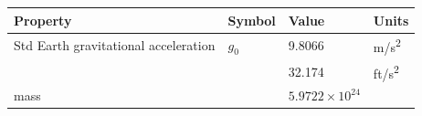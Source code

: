 \documentclass[
]{book}
\begin{document}
\begin{longtable}[]{@{}llll@{}}
\toprule
\begin{minipage}[b]{0.34\columnwidth}\raggedright
Property\strut
\end{minipage} & \begin{minipage}[b]{0.06\columnwidth}\raggedright
Symbol\strut
\end{minipage} & \begin{minipage}[b]{0.44\columnwidth}\raggedright
Value\strut
\end{minipage} & \begin{minipage}[b]{0.05\columnwidth}\raggedright
Units\strut
\end{minipage}\tabularnewline
\midrule
\endhead
\begin{minipage}[t]{0.34\columnwidth}\raggedright
Std Earth gravitational acceleration\strut
\end{minipage} & \begin{minipage}[t]{0.06\columnwidth}\raggedright
\(g_0\)\strut
\end{minipage} & \begin{minipage}[t]{0.44\columnwidth}\raggedright
9.8066\strut
\end{minipage} & \begin{minipage}[t]{0.05\columnwidth}\raggedright
m/s\textsuperscript{2}\strut
\end{minipage}\tabularnewline
\begin{minipage}[t]{0.34\columnwidth}\raggedright
\strut
\end{minipage} & \begin{minipage}[t]{0.06\columnwidth}\raggedright
\strut
\end{minipage} & \begin{minipage}[t]{0.44\columnwidth}\raggedright
32.174\strut
\end{minipage} & \begin{minipage}[t]{0.05\columnwidth}\raggedright
ft/s\textsuperscript{2}\strut
\end{minipage}\tabularnewline
\begin{minipage}[t]{0.34\columnwidth}\raggedright
mass\strut
\end{minipage} & \begin{minipage}[t]{0.06\columnwidth}\raggedright
\strut
\end{minipage} & \begin{minipage}[t]{0.44\columnwidth}\raggedright
\(5.9722 \times 10^{24}\)\strut
\end{minipage} & \begin{minipage}[t]{0.05\columnwidth}\raggedright

\end{minipage}
\end{longtable}
\end{document}
